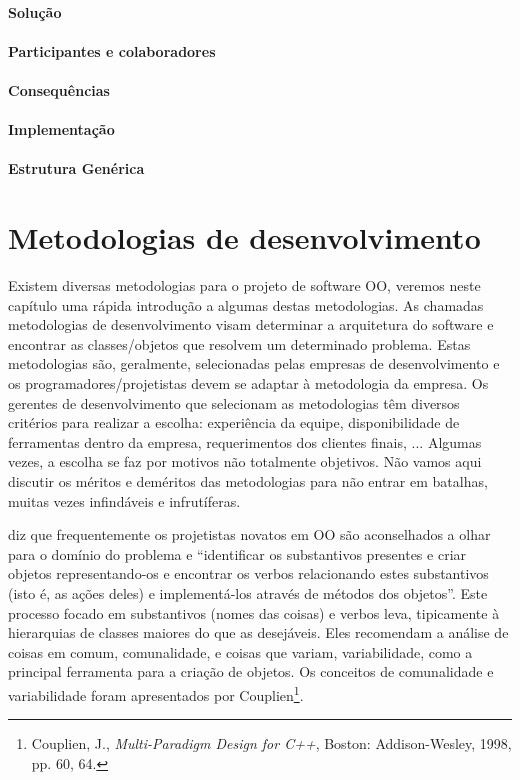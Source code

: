 \documentclass[
	11pt,				%
	openright,
	twoside,			%
	a4paper,			%
	english,			%
	french,
	brazil,				%
	sumario=tradicional
	]{abntex2}
\begin{document}
\subsubsection{Solução}
\subsubsection{Participantes e colaboradores}
\subsubsection{Consequências}
\subsubsection{Implementação}
\subsubsection{Estrutura Genérica}

\chapter{Metodologias de desenvolvimento}

Existem diversas metodologias para o projeto de software OO, veremos neste capítulo uma rápida introdução a algumas destas metodologias. As chamadas metodologias de desenvolvimento visam determinar a arquitetura do software e encontrar as classes/objetos que resolvem um determinado problema. Estas metodologias são, geralmente, selecionadas pelas empresas de desenvolvimento e os programadores/projetistas devem se adaptar à metodologia da empresa. Os gerentes de desenvolvimento que selecionam as metodologias têm diversos critérios para realizar a escolha: experiência da equipe, disponibilidade de ferramentas dentro da empresa, requerimentos dos clientes finais, ... Algumas vezes, a escolha se faz por motivos não totalmente objetivos. Não vamos aqui discutir os méritos e deméritos das metodologias para não entrar em batalhas, muitas vezes infindáveis e infrutíferas.

 diz que frequentemente os projetistas novatos em OO são aconselhados a olhar para o domínio do problema e ``identificar os substantivos presentes e criar objetos representando-os e encontrar os verbos relacionando estes substantivos (isto é, as ações deles) e implementá-los através de métodos dos objetos''. Este processo focado em substantivos (nomes das coisas) e verbos leva, tipicamente à hierarquias de classes maiores do que as desejáveis. Eles recomendam a análise de coisas em comum, comunalidade, e coisas que variam, variabilidade, como a principal ferramenta para a criação de objetos. Os conceitos de comunalidade e variabilidade foram apresentados por Couplien\footnote{Couplien, J., \textit{Multi-Paradigm Design for C++}, Boston: Addison-Wesley, 1998, pp. 60, 64.}.
\end{document}
